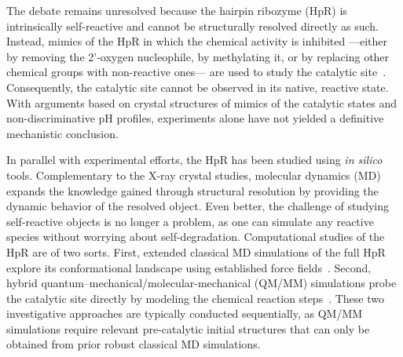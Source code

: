 \documentclass[journal=jacsat,manuscript=article]{achemso}
\begin{document}
The debate remains unresolved because the hairpin ribozyme (HpR) is intrinsically self-reactive 
and cannot be structurally resolved directly as such.
Instead, mimics of the HpR in which the chemical activity is inhibited ---either by removing the 2'-oxygen nucleophile, 
by methylating it, or by replacing other chemical groups with non-reactive ones--- are used to study the catalytic site~\cite{rupert_crystal_2001,salter_water_2006}.
Consequently, the catalytic site cannot be observed in its native, reactive state.
With arguments based on crystal structures of mimics of the catalytic states and non-discriminative pH profiles, 
experiments alone have not yielded a definitive mechanistic conclusion.

In parallel with experimental efforts, the HpR has been studied using \textit{in silico} tools.
Complementary to the X-ray crystal studies, molecular dynamics (MD) 
expands the knowledge gained through structural resolution by providing the dynamic behavior of the resolved object.
Even better, the challenge of studying self-reactive objects is no longer a problem, 
as one can simulate any reactive species without worrying about self-degradation. 
Computational studies of the HpR are of two sorts.
First, 
extended classical MD simulations of the full HpR explore its conformational landscape using established force fields~\cite{mlynsky_extensive_2010,mlynsky_reactive_2015,kumar_mechanistic_2018}.
Second, hybrid quantum–mechanical/molecular-mechanical (QM/MM) simulations probe the catalytic site directly 
by modeling the chemical reaction steps~\cite{mlynsky_comparison_2014,mlynsky_qmmm_2011,nam_electrostatic_2008,kumar_deciphering_2020}.
These two investigative approaches are typically conducted sequentially, 
as QM/MM simulations require relevant pre-catalytic initial structures 
that can only be obtained from prior robust classical MD simulations.
\end{document}
